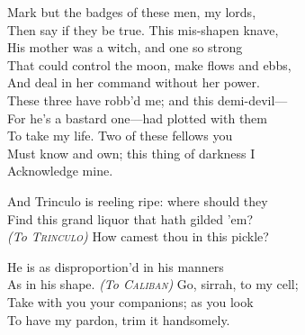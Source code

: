 \begin{verse_speech}[Prospero] 
Mark but the badges of these men, my lords,\\
Then say if they be true. This mis-shapen knave,\\
His mother was a witch, and one so strong\\
That could control the moon, make flows and ebbs,\\
And deal in her command without her power.\\
These three have robb'd me; and this demi-devil—\\
For he's a bastard one—had plotted with them\\
To take my life. Two of these fellows you\\
Must know and own; this thing of darkness I\\
Acknowledge mine.
\end{verse_speech}




\begin{verse_speech}[Alonso] 
And Trinculo is reeling ripe: where should they\\
Find this grand liquor that hath gilded 'em?\\
\textit{(To \textsc{Trinculo})} How camest thou in this pickle?
\end{verse_speech}







\begin{verse_speech}[Prospero] 
He is as disproportion'd in his manners\\
As in his shape. \textit{(To \textsc{Caliban})} Go, sirrah, to my cell;\\
Take with you your companions; as you look\\
To have my pardon, trim it handsomely.
\end{verse_speech}

